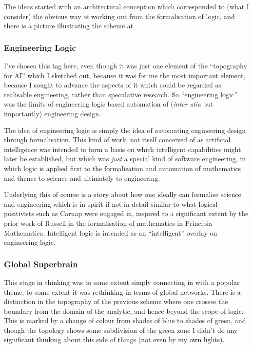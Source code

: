 \documentclass{rbjk}
\begin{document}
\begin{article}
The ideas started with an architectural conception which corresponded to (what I consider) the obvious way of working out from the formalisation of logic, and there is a picture illustrating the scheme at 

\subsubsection{Engineering Logic}

I've chosen this tag here, even though it was just one element of the ``topography for AI'' which I sketched out, because it was for me the most important element, because I sought to advance the aspects of it which could be regarded as realisable engineering, rather than speculative research.
So ``engineering logic'' was the limits of engineering logic based automation of ({\it inter alia} but importantly) engineering design.

The idea of engineering logic is simply the idea of automating engineering design through formalisation.
This kind of work, not itself conceived of as artificial intelligence was intended to form a basis on which intelligent capabilities might later be established, but which was {\it just} a special kind of software engineering, in which logic is applied first to the formalisation and automation of mathematics and thence to science and ultimately to engineering.

Underlying this of course is a story about how one ideally can formalise science and engineering which is in spirit if not in detail similar to what logical positivists such as Carnap were engaged in, inspired to a significant extent by the prior work of Russell in the formalisation of mathematics in Principia Mathematica.
Intelligent logic is intended as an ``intelligent'' overlay on engineering logic.

\subsubsection{Global Superbrain}

This stage in thinking was to some extent simply connecting in with a popular theme, to some extent it was rethinking in terms of global networks.
There is a distinction in the topography of the previous scheme where one crosses the boundary from the domain of the analytic, and hence beyond the scope of logic.
This is marked by a change of colour from shades of blue to shades of green, and though the topology shows some subdivision of the green zone I didn't do any significant thinking about this side of things (not even by my own lights).


\end{article}
\end{document}
